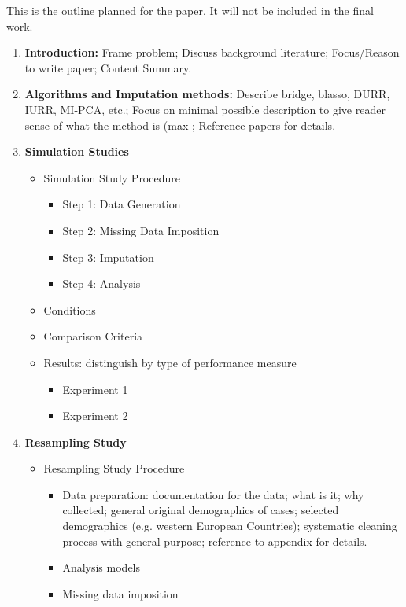This is the outline planned for the paper. It will not be included in the final work.

\begin{enumerate}

 \item \textbf{Introduction:}
	Frame problem; 
	Discuss background literature;
	Focus/Reason to write paper;
	Content Summary.

 \item \textbf{Algorithms and Imputation methods:}
	Describe bridge, blasso, DURR, IURR, MI-PCA, etc.;
	Focus on minimal possible description to give reader sense of what the method is (max \cite{dengEtAl:2016};
	Reference papers for details.

 \item \textbf{Simulation Studies}

  \begin{itemize}

   \item Simulation Study Procedure

	\begin{itemize}
 	   \item Step 1: Data Generation
	   \item Step 2: Missing Data Imposition
	   \item Step 3: Imputation
	   \item Step 4: Analysis
	\end{itemize}

   \item Conditions
   \item Comparison Criteria	   
   \item Results: distinguish by type of performance measure

	\begin{itemize}
 	   \item Experiment 1
	   \item Experiment 2
	\end{itemize}

  \end{itemize}

 \item \textbf{Resampling Study}

  \begin{itemize}
	\item Resampling Study Procedure
	\begin{itemize}
 	   \item Data preparation: 
		documentation for the data;
		what is it;
		why collected;
		general original demographics of cases;
		selected demographics (e.g. western European Countries);
		systematic cleaning process with general purpose;
		reference to appendix for details.
	   \item Analysis models
	   \item Missing data imposition
	\end{itemize}


\end{itemize}
\end{enumerate}
